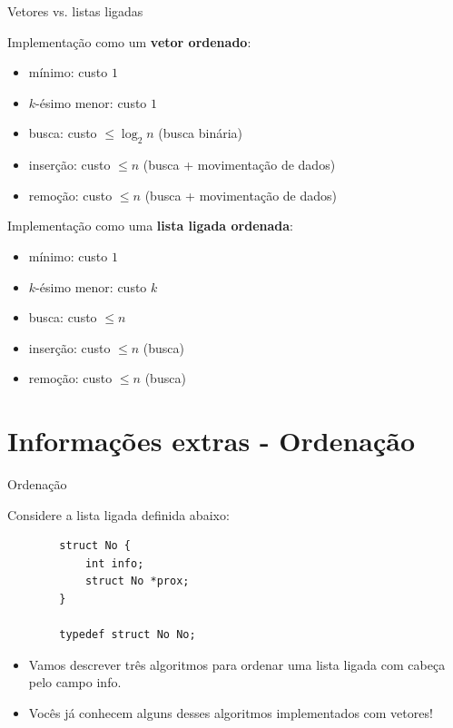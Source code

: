\documentclass{beamer}
\begin{document}
\begin{frame}[fragile]{Vetores vs. listas ligadas}

    Implementação como um \textbf{vetor ordenado}:
    \begin{itemize}
        \item mínimo: custo $1$
        \item $k$-ésimo menor: custo $1$
        \item busca: custo $\le\log_2n$ (busca binária)
        \item inserção: custo $\le n$ (busca + movimentação de dados)
        \item remoção: custo $\le n$ (busca + movimentação de dados)
    \end{itemize}

    Implementação como uma \textbf{lista ligada ordenada}:
    \begin{itemize}
        \item mínimo: custo $1$
        \item $k$-ésimo menor: custo $k$
        \item busca: custo $\le n$
        \item inserção: custo $\le n$ (busca)
        \item remoção: custo $\le n$ (busca)
    \end{itemize}

\end{frame}



\section{Informações extras - Ordenação}

\begin{frame}[fragile]{Ordenação}

    Considere a lista ligada definida abaixo:
    \begin{verbatim}
        struct No {
            int info;
            struct No *prox;
        }

        typedef struct No No;
    \end{verbatim}

    \begin{itemize}
        \item Vamos descrever três algoritmos para ordenar uma lista ligada com cabeça pelo campo info.
        \item Vocês já conhecem alguns desses algoritmos implementados com vetores!
    \end{itemize}
\end{frame}
\end{document}

